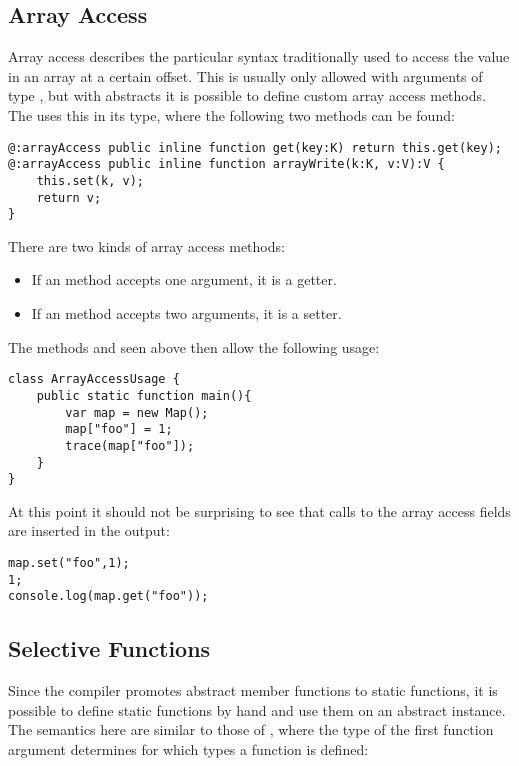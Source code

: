 \subsection{Array Access}
\label{types-abstract-array-access}

Array access describes the particular syntax traditionally used to access the value in an array at a certain offset. This is usually only allowed with arguments of type , but with abstracts it is possible to define custom array access methods. The  uses this in its  type, where the following two methods can be found:

\begin{lstlisting}
@:arrayAccess public inline function get(key:K) return this.get(key);
@:arrayAccess public inline function arrayWrite(k:K, v:V):V {
	this.set(k, v);
	return v;
}
\end{lstlisting}
There are two kinds of array access methods:

\begin{itemize}
	\item If an  method accepts one argument, it is a getter.
	\item If an  method accepts two arguments, it is a setter.
\end{itemize}
The methods  and  seen above then allow the following usage:

\begin{lstlisting}
class ArrayAccessUsage {
	public static function main(){
		var map = new Map();
		map["foo"] = 1;
		trace(map["foo"]);
	}
}
\end{lstlisting}
At this point it should not be surprising to see that calls to the array access fields are inserted in the output:

\begin{lstlisting}
map.set("foo",1);
1;
console.log(map.get("foo"));
\end{lstlisting}


\subsection{Selective Functions}
\label{types-abstract-selective-functions}

Since the compiler promotes abstract member functions to static functions, it is possible to define static functions by hand and use them on an abstract instance. The semantics here are similar to those of , where the type of the first function argument determines for which types a function is defined:

